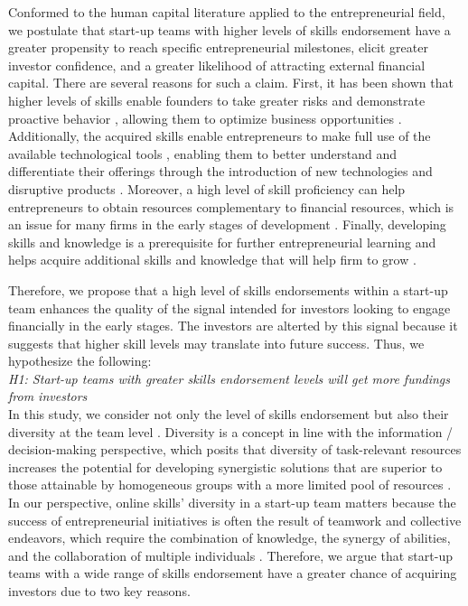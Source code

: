 \documentclass[12pt]{article}
\begin{document}
Conformed to the human capital literature applied to the entrepreneurial field, we postulate that start-up teams with higher levels of skills endorsement have a greater propensity to reach specific entrepreneurial milestones, elicit greater investor confidence, and a greater likelihood of attracting external financial capital. There are several reasons for such a claim. First, it has been shown that higher levels of skills enable founders to take greater risks and demonstrate proactive behavior \citep{becherer1999proactive}, allowing them to optimize business opportunities \citep{shane2000promise, chandler1994founder}. Additionally, the acquired skills enable entrepreneurs to make full use of the available technological tools \citep{nambisan2017digital}, enabling them to better understand and differentiate their offerings through the introduction of new technologies and disruptive products \citep{marvel2007technology}. Moreover, a high level of skill proficiency can help entrepreneurs to obtain resources complementary to financial resources, which is an issue for many firms in the early stages of development \citep{beckman2007early}. Finally, developing skills and knowledge is a prerequisite for further entrepreneurial learning and helps acquire additional skills and knowledge that will help firm to grow \citep{hunter1986cognitive}.

Therefore, we propose that a high level of skills endorsements within a start-up team enhances the quality of the signal intended for investors looking to engage financially in the early stages. The investors are alterted by this signal because it suggests that higher skill levels may translate into future success. Thus, we hypothesize the following: \\

\noindent \textit{H1: Start-up teams with greater skills endorsement levels will get more fundings from investors} \\

In this study, we consider not only the level of skills endorsement but also their diversity at the team level \citep{harrison2007s, sundermeier2022entrepreneurial}. Diversity is a concept in line with the information / decision-making perspective, which posits that diversity of task-relevant resources increases the potential for developing synergistic solutions that are superior to those attainable by homogeneous groups with a more limited pool of resources \citep{williamsky1998demographyand}. In our perspective, online skills' diversity in a start-up team matters because the success of entrepreneurial initiatives is often the result of teamwork and collective endeavors, which require the combination of knowledge, the synergy of abilities, and the collaboration of multiple individuals \citep{klotz2014new}. Therefore, we argue that start-up teams with a wide range of skills endorsement have a greater chance of acquiring investors due to two key reasons.
\end{document}
